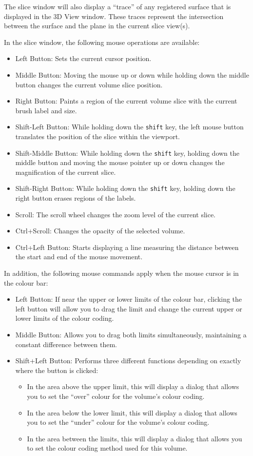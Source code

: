 \documentclass[11pt,letterpaper]{article}
\newcommand{\ident}[1]{{\tt #1}}
\begin{document}
The slice window will also display a ``trace'' of any registered
surface that is displayed in the 3D View window. These traces
represent the intersection between the surface and the plane in the
current slice view(s).

In the slice window, the following mouse operations are available:

\begin{itemize}
\item Left Button: Sets the current cursor position.
\item Middle Button: Moving the mouse up or down while holding down
  the middle button changes the current volume slice position.
\item Right Button: Paints a region of the current volume slice with the
current brush label and size.
\item Shift-Left Button: While holding down the \ident{shift} key, the
  left mouse button translates the position of the slice within the
  viewport.
\item Shift-Middle Button: While holding down the \ident{shift} key,
  holding down the middle button and moving the mouse pointer up or down
  changes the magnification of the current slice.
\item Shift-Right Button: While holding down the \ident{shift} key,
  holding down the right button erases regions of the labels.
\item Scroll: The scroll wheel changes the zoom level of the current slice.
\item Ctrl+Scroll: Changes the opacity of the selected volume.
\item Ctrl+Left Button: Starts displaying a line measuring the
 distance between the start and end of the mouse movement.
\end{itemize}

In addition, the following mouse commands apply when the mouse cursor is in the colour bar:
\begin{itemize}
\item Left Button: If near the upper or lower limits of the colour bar,
clicking the left button will allow you to drag the limit and change the
current upper or lower limits of the colour coding.
\item Middle Button: Allows you to drag both limits simultaneously, maintaining a 
constant difference between them.
\item Shift+Left Button: Performs three different functions depending on
exactly where the button is clicked:
\begin{itemize}
\item In the area above the upper limit,
 this will display a dialog that allows you to set the ``over'' colour
 for the volume's colour coding.
\item In the area below the lower limit,
 this will display a dialog that allows you to set the ``under'' colour
 for the volume's colour coding.
\item In the area between the limits, this will display a dialog that
allows you to set the colour coding method used for this volume.
\end{itemize}
\end{itemize}
\end{document}
